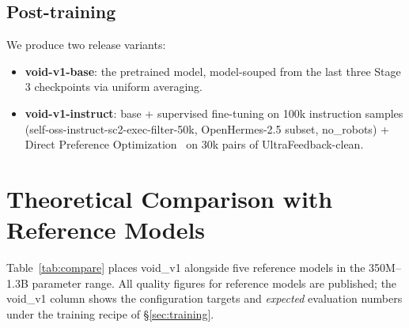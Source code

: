 \documentclass[11pt,a4paper]{article}
\theoremstyle{definition}
\theoremstyle{remark}
\begin{document}
\subsection{Post-training}

We produce two release variants:
\begin{itemize}[leftmargin=1.5em,itemsep=0.2em]
    \item \textbf{void-v1-base}: the pretrained model, model-souped from
          the last three Stage 3 checkpoints via uniform averaging.
    \item \textbf{void-v1-instruct}: base + supervised fine-tuning on
          100k instruction samples
          (self-oss-instruct-sc2-exec-filter-50k, OpenHermes-2.5 subset,
          no\_robots) + Direct Preference
          Optimization~\citep{rafailov2023dpo} on 30k pairs of
          UltraFeedback-clean.
\end{itemize}

\section{Theoretical Comparison with Reference Models}
\label{sec:compare}

Table~\ref{tab:compare} places void\_v1 alongside five reference
models in the 350M--1.3B parameter range. All quality figures for reference
models are published; the void\_v1 column shows the configuration
targets and \emph{expected} evaluation numbers under the training recipe
of \S\ref{sec:training}.
\end{document}
